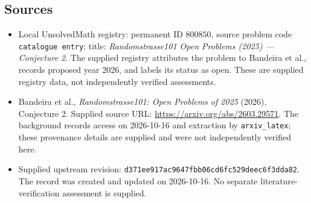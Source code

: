 \documentclass[11pt]{article}
\begin{document}
\subsection{Sources}
\begin{itemize}
\item Local UnsolvedMath registry: permanent ID \(800850\), source problem code \texttt{catalogue entry}; title: \emph{Randomstrasse101 Open Problems (2025) --- Conjecture 2}. The supplied registry attributes the problem to Bandeira et al., records proposed year 2026, and labels its status as open. These are supplied registry data, not independently verified assessments.
\item Bandeira et al., \emph{Randomstrasse101: Open Problems of 2025} (2026), Conjecture 2. Supplied source URL: \url{https://arxiv.org/abs/2603.29571}. The background records access on 2026-10-16 and extraction by \texttt{arxiv\_latex}; these provenance details are supplied and were not independently verified here.
\item Supplied upstream revision: \texttt{d371ee917ac9647fbb06cd6fc529deec6f3dda82}. The record was created and updated on 2026-10-16. No separate literature-verification assessment is supplied.
\end{itemize}
\end{document}
